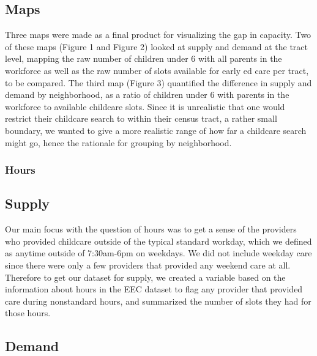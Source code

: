 \documentclass[man]{apa6}
\begin{document}
\subsection{Maps}\label{maps}

Three maps were made as a final product for visualizing the gap in
capacity. Two of these maps (Figure 1 and Figure 2) looked at supply and
demand at the tract level, mapping the raw number of children under 6
with all parents in the workforce as well as the raw number of slots
available for early ed care per tract, to be compared. The third map
(Figure 3) quantified the difference in supply and demand by
neighborhood, as a ratio of children under 6 with parents in the
workforce to available childcare slots. Since it is unrealistic that one
would restrict their childcare search to within their census tract, a
rather small boundary, we wanted to give a more realistic range of how
far a childcare search might go, hence the rationale for grouping by
neighborhood.

\subsubsection{Hours}\label{hours}

\subsection{Supply}\label{supply-1}

Our main focus with the question of hours was to get a sense of the
providers who provided childcare outside of the typical standard
workday, which we defined as anytime outside of 7:30am-6pm on weekdays.
We did not include weekday care since there were only a few providers
that provided any weekend care at all. Therefore to get our dataset for
supply, we created a variable based on the information about hours in
the EEC dataset to flag any provider that provided care during
nonstandard hours, and summarized the number of slots they had for those
hours.

\subsection{Demand}\label{demand-1}
\end{document}
